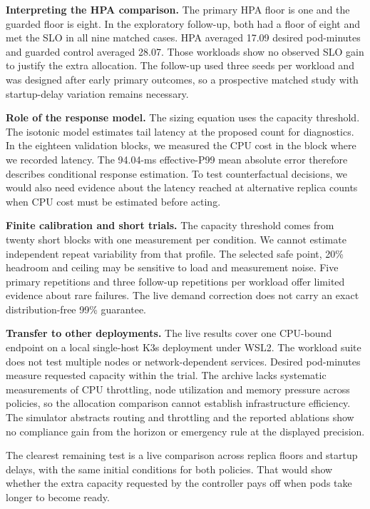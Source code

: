 \documentclass[10pt,twocolumn,a4paper]{article}
\begin{document}
\textbf{Interpreting the HPA comparison.} The primary HPA floor is one and the guarded floor is eight. In the exploratory follow-up, both had a floor of eight and met the SLO in all nine matched cases. HPA averaged 17.09 desired pod-minutes and guarded control averaged 28.07. Those workloads show no observed SLO gain to justify the extra allocation. The follow-up used three seeds per workload and was designed after early primary outcomes, so a prospective matched study with startup-delay variation remains necessary.

\textbf{Role of the response model.} The sizing equation uses the capacity threshold. The isotonic model estimates tail latency at the proposed count for diagnostics. In the eighteen validation blocks, we measured the CPU cost in the block where we recorded latency. The 94.04-ms effective-P99 mean absolute error therefore describes conditional response estimation. To test counterfactual decisions, we would also need evidence about the latency reached at alternative replica counts when CPU cost must be estimated before acting.

\textbf{Finite calibration and short trials.} The capacity threshold comes from twenty short blocks with one measurement per condition. We cannot estimate independent repeat variability from that profile. The selected safe point, 20\% headroom and ceiling may be sensitive to load and measurement noise. Five primary repetitions and three follow-up repetitions per workload offer limited evidence about rare failures. The live demand correction does not carry an exact distribution-free 99\% guarantee.

\textbf{Transfer to other deployments.} The live results cover one CPU-bound endpoint on a local single-host K3s deployment under WSL2. The workload suite does not test multiple nodes or network-dependent services. Desired pod-minutes measure requested capacity within the trial. The archive lacks systematic measurements of CPU throttling, node utilization and memory pressure across policies, so the allocation comparison cannot establish infrastructure efficiency. The simulator abstracts routing and throttling and the reported ablations show no compliance gain from the horizon or emergency rule at the displayed precision.

The clearest remaining test is a live comparison across replica floors and startup delays, with the same initial conditions for both policies. That would show whether the extra capacity requested by the controller pays off when pods take longer to become ready.
\end{document}

